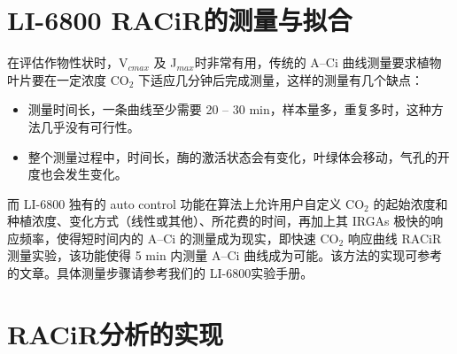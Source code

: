 \documentclass[]{krantz}
\makeatletter
\newenvironment{Shaded}{\begin{snugshade}}{\end{snugshade}}
\newcommand{\StringTok}[1]{\textcolor[rgb]{0.31,0.60,0.02}{#1}}
\newcommand{\OperatorTok}[1]{\textcolor[rgb]{0.81,0.36,0.00}{\textbf{#1}}}
\newcommand{\NormalTok}[1]{#1}
\providecommand{\tightlist}{%
  \setlength{\itemsep}{0pt}\setlength{\parskip}{0pt}}
\newenvironment{kframe}{%
\medskip{}
\setlength{\fboxsep}{.8em}
 \def\at@end@of@kframe{}%
 \ifinner\ifhmode%
  \def\at@end@of@kframe{\end{minipage}}%
  \begin{minipage}{\columnwidth}%
 \fi\fi%
 \def\FrameCommand##1{\hskip\@totalleftmargin \hskip-\fboxsep
 \colorbox{shadecolor}{##1}\hskip-\fboxsep
     \hskip-\linewidth \hskip-\@totalleftmargin \hskip\columnwidth}%
 \MakeFramed {\advance\hsize-\width
   \@totalleftmargin\z@ \linewidth\hsize
   \@setminipage}}%
 {\par\unskip\endMakeFramed%
 \at@end@of@kframe}
\renewenvironment{Shaded}{\begin{kframe}}{\end{kframe}}
\theoremstyle{definition}
\theoremstyle{definition}
\theoremstyle{definition}
\theoremstyle{remark}
\makeatother
\begin{document}
\begin{Shaded}
\end{Shaded}

\section{\texorpdfstring{LI-6800
RACiR\texttrademark 的测量与拟合}{LI-6800 RACiR的测量与拟合}}\label{li-6800-racir}

在评估作物性状时，V\(_{cmax}\) 及 J\(_{max}\)时非常有用，传统的 A--Ci
曲线测量要求植物叶片要在一定浓度 CO\(_{2}\)
下适应几分钟后完成测量，这样的测量有几个缺点：

\begin{itemize}
\tightlist
\item
  测量时间长，一条曲线至少需要 20 -- 30
  min，样本量多，重复多时，这种方法几乎没有可行性。
\item
  整个测量过程中，时间长，酶的激活状态会有变化，叶绿体会移动，气孔的开度也会发生变化。
\end{itemize}

而 LI-6800 独有的 auto control 功能在算法上允许用户自定义 CO\(_{2}\)
的起始浓度和种植浓度、变化方式（线性或其他）、所花费的时间，再加上其
IRGAs 极快的响应频率，使得短时间内的 A--Ci 的测量成为现实，即快速
CO\(_{2}\) 响应曲线 RACiR\texttrademark
测量实验，该功能使得 5 min 内测量 A--Ci 曲线成为可能。该方法的实现可参考
\citet{Stinziano2017} 的文章。具体测量步骤请参考我们的 LI-6800实验手册。

\section{\texorpdfstring{RACiR\texttrademark 分析的实现}{RACiR分析的实现}}\label{racir}
\end{document}
